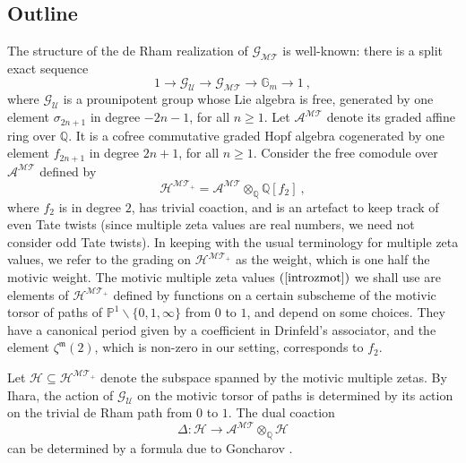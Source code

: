 \documentclass[10pt]{amsart}
\theoremstyle{definition}
\theoremstyle{remark}
\numberwithin{equation}{section}
\newcommand{\Pro}{\mathbb P}
\newcommand{\Ho}{\mathcal{H}}
\newcommand{\Homt}{\mathcal{H^{MT_+}}}
\newcommand{\MT}{\mathcal{MT}}
\newcommand{\GMT}{\mathcal{G_{MT}}}
\newcommand{\G}{\mathbb{G}}
\newcommand{\GU}{\mathcal{G}_{\mathcal{U}}}
\newcommand{\zetam}{\zeta^{ \mathfrak{m}}}
\newcommand{\Q}{\mathbb Q}
\newcommand{\To}{\longrightarrow}
\newcommand{\Amt}{\mathcal{A}^{\MT}}
\begin{document}
\subsection{Outline} The structure of  the de Rham realization of  $\GMT$ is well-known: there is a split exact sequence 
$$1 \To \GU \To \GMT \To \G_m \To 1\ , $$
where $\GU$ is a prounipotent group whose   Lie algebra is free,  generated by  one element $\sigma_{2n+1}$ in  degree $-2n-1$, for all $n\geq 1$. 
Let   $\Amt$ 
denote its graded  affine ring over $\Q$. It  is a cofree commutative graded Hopf algebra cogenerated by one element  $f_{2n+1}$ in  degree $2n+1$, for  all $n\geq 1$.
Consider the free comodule over $\Amt$ defined by
$$\Homt= \Amt\otimes_{\Q} \Q[f_2]\ ,$$
 where $f_2$ is  in degree $2$, has trivial coaction,  and is  an artefact to keep track of  even Tate twists (since multiple zeta values are real numbers, we need not consider odd Tate twists).   In keeping with the usual terminology for multiple zeta values,  we refer to the grading on $\Homt$ as the weight, which is one half the motivic weight.
  The motivic multiple zeta values  $(\ref{introzmot})$ we shall use   are    elements of $\Homt$ defined  by     functions on a certain subscheme of  the motivic torsor of paths of $\Pro^1\backslash \{0,1,\infty\}$ from $0$ to $1$, and depend on some choices.
  They have a canonical period given by a  coefficient in Drinfeld's associator, and the element $\zetam(2)$, which is non-zero in our setting, corresponds to $f_2$. 
  
  Let $\Ho\subseteq \Homt$ denote the subspace   spanned by the motivic multiple zetas. By Ihara,
the action  of $\GU$  on the motivic torsor of paths is determined by its action on the trivial de Rham path from $0$ to $1$. The dual coaction
 \begin{equation} \label{introcoaction}
  \Delta:\Ho\To \Amt \otimes_{\Q} \Ho
  \end{equation}  can be  determined   by a  formula due to   Goncharov  \cite{GG}.
  
\end{document}

